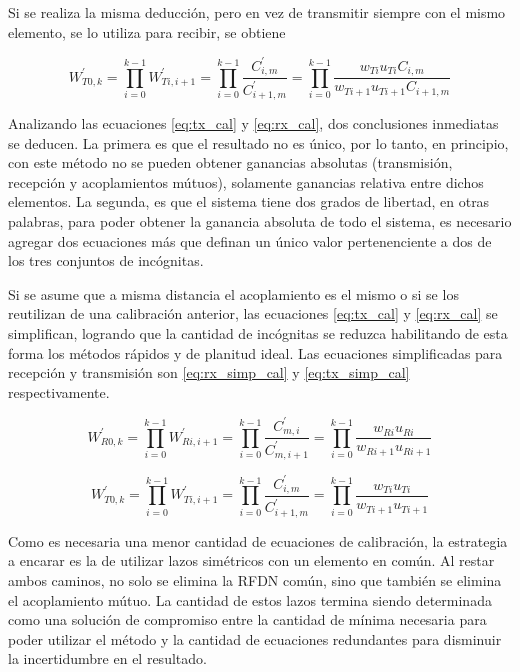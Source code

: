 Si se realiza la misma deducción, pero en vez de transmitir siempre con el mismo elemento, se lo utiliza para recibir, se obtiene

\begin{equation}
	W^{'}_{T0,k} = \prod_{i=0}^{k-1} W^{'}_{Ti,i+1} = \prod_{i=0}^{k-1}\dfrac{C^{'}_{i,m}}{C^{'}_{i+1, m}} =
		\prod_{i=0}^{k-1}\dfrac{w_{Ti} u_{Ti} C_{i,m}}{w_{Ti + 1} u_{Ti + 1}C_{i + 1, m}}
	\label{eq:tx_cal}
\end{equation}

Analizando las ecuaciones \ref{eq:tx_cal} y \ref{eq:rx_cal}, dos conclusiones inmediatas se deducen. La primera es que el
resultado no es único, por lo tanto, en principio, con este método no se pueden obtener ganancias absolutas (transmisión,
recepción y acoplamientos mútuos), solamente ganancias relativa entre dichos elementos. La segunda, es que el sistema tiene
dos grados de libertad, en otras palabras, para poder obtener la ganancia absoluta de todo el sistema, es necesario agregar
dos ecuaciones más que definan un único valor pertenenciente a dos de los tres conjuntos de incógnitas.

Si se asume que a misma distancia el acoplamiento es el mismo o si se los reutilizan de una calibración anterior, las
ecuaciones \ref{eq:tx_cal} y \ref{eq:rx_cal} se simplifican, logrando que la cantidad de incógnitas se reduzca habilitando
de esta forma los métodos rápidos y de planitud ideal. Las ecuaciones simplificadas para recepción y transmisión son
\ref{eq:rx_simp_cal} y \ref{eq:tx_simp_cal} respectivamente.

\begin{equation}
	W^{'}_{R0,k} = \prod_{i=0}^{k-1} W^{'}_{Ri,i+1} = \prod_{i=0}^{k-1}\dfrac{C^{'}_{m,i}}{C^{'}_{m,i+1}} =
		\prod_{i=0}^{k-1}\dfrac{w_{Ri} u_{Ri}}{w_{Ri + 1} u_{Ri + 1}}
	\label{eq:rx_simp_cal}
\end{equation}

\begin{equation}
	W^{'}_{T0,k} = \prod_{i=0}^{k-1} W^{'}_{Ti,i+1} = \prod_{i=0}^{k-1}\dfrac{C^{'}_{i,m}}{C^{'}_{i+1, m}} =
		\prod_{i=0}^{k-1}\dfrac{w_{Ti} u_{Ti}}{w_{Ti + 1} u_{Ti + 1}}
	\label{eq:tx_simp_cal}
\end{equation}

Como es necesaria una menor cantidad de ecuaciones de calibración, la estrategia a encarar es la de utilizar lazos simétricos
con un elemento en común. Al restar ambos caminos, no solo se elimina la RFDN común, sino que también se elimina el
acoplamiento mútuo. La cantidad de estos lazos termina siendo determinada como una solución de compromiso entre la cantidad de
mínima necesaria para poder utilizar el método y la cantidad de ecuaciones redundantes para disminuir la incertidumbre en el
resultado.

